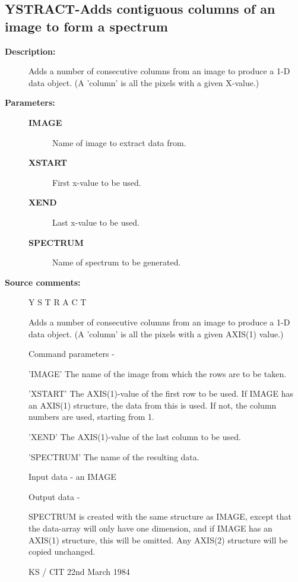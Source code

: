 \subsection{YSTRACT-\label{YSTRACT}Adds contiguous columns of an image to form a spectrum}
\begin{description}

\item [\textbf{Description:}]
 Adds a number of consecutive columns from an image to produce a 1-D
 data object.  (A 'column' is all the pixels with a given X-value.)

\item [\textbf{Parameters:}]
\begin{description}
\item [\textbf{IMAGE}]
 Name of image to extract data from.
\item [\textbf{XSTART}]
 First x-value to be used.
\item [\textbf{XEND}]
 Last x-value to be used.
\item [\textbf{SPECTRUM}]
 Name of spectrum to be generated.
\end{description}

\item [\textbf{Source comments:}]
\begin{terminalv}
 Y S T R A C T

 Adds a number of consecutive columns from an image to
 produce a 1-D data object.  (A 'column' is all the
 pixels with a given AXIS(1) value.)

 Command parameters -

 'IMAGE'    The name of the image from which the rows
            are to be taken.

 'XSTART'   The AXIS(1)-value of the first row to be used.
            If IMAGE has an AXIS(1) structure, the data from this
            is used.  If not, the column numbers are used,
            starting from 1.

 'XEND'     The AXIS(1)-value of the last column to be used.

 'SPECTRUM' The name of the resulting data.

 Input data - an IMAGE

 Output data -

 SPECTRUM is created with the same structure as IMAGE,
 except that the data-array will only have one dimension, and if
 IMAGE has an AXIS(1) structure, this will be omitted.  Any AXIS(2)
 structure will be copied unchanged.

                                 KS / CIT 22nd March 1984
\end{terminalv}
\end{description}
